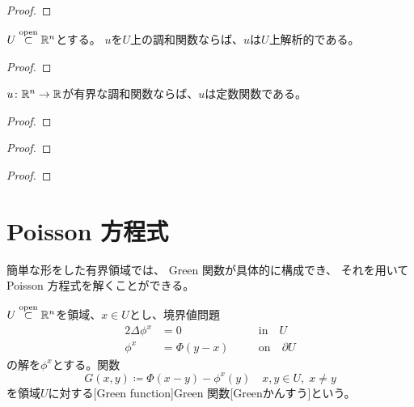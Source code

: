 \documentclass[report]{jlreq}
\begin{document}
\begin{proof}
    \TODO{}
\end{proof}

\begin{theorem}[解析性]
    $U \stackrel{\text{open}}{\subset} \mathbb{R}^n$とする。
    $u$を$U$上の調和関数ならば、$u$は$U$上解析的である。
\end{theorem}

\begin{proof}
    \TODO{}
\end{proof}

\begin{theorem}
    $u \colon \mathbb{R}^n \to \mathbb{R}$が有界な調和関数ならば、$u$は定数関数である。
\end{theorem}

\begin{proof}
    \TODO{}
\end{proof}

\begin{theorem}[積分表示]
    \TODO{}
\end{theorem}

\begin{proof}
    \TODO{}
\end{proof}

\begin{theorem}
    \TODO{}
\end{theorem}

\begin{proof}
    \TODO{}
\end{proof}

%
\section{Poisson 方程式}

簡単な形をした有界領域では、
Green 関数が具体的に構成でき、
それを用いて Poisson 方程式を解くことができる。


\begin{definition}[Green 関数]
    $U \stackrel{\text{open}}{\subset} \mathbb{R}^n$を領域、$x \in U$とし、境界値問題
    \begin{alignat}{2}
        \Delta \phi^x &= 0 &&\quad \text{in} \quad U \\
        \phi^x &= \Phi(y - x) &&\quad \text{on} \quad \partial U
    \end{alignat}
    の解を$\phi^x$とする。関数
    \begin{equation}
        G(x, y) \coloneqq \Phi(x - y) - \phi^x(y) \quad x, y \in U,\; x \neq y
    \end{equation}
    を領域$U$に対する[Green function]{Green 関数}[Greenかんすう]という。
\end{definition}
\end{document}
